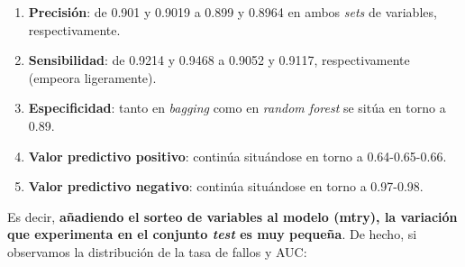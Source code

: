 \documentclass[
]{article}
\providecommand{\tightlist}{%
  \setlength{\itemsep}{0pt}\setlength{\parskip}{0pt}}
\begin{document}
\begin{enumerate}
\def\labelenumi{\arabic{enumi}.}
\tightlist
\item
  \textbf{Precisión}: de 0.901 y 0.9019 a 0.899 y 0.8964 en ambos
  \emph{sets} de variables, respectivamente.
\item
  \textbf{Sensibilidad}: de 0.9214 y 0.9468 a 0.9052 y 0.9117,
  respectivamente (empeora ligeramente).
\item
  \textbf{Especificidad}: tanto en \emph{bagging} como en \emph{random
  forest} se sitúa en torno a 0.89.
\item
  \textbf{Valor predictivo positivo}: continúa situándose en torno a
  0.64-0.65-0.66.
\item
  \textbf{Valor predictivo negativo}: continúa situándose en torno a
  0.97-0.98.
\end{enumerate}

Es decir, \textbf{añadiendo el sorteo de variables al modelo (mtry), la
variación que experimenta en el conjunto \emph{test} es muy pequeña}. De
hecho, si observamos la distribución de la tasa de fallos y AUC:
\end{document}
